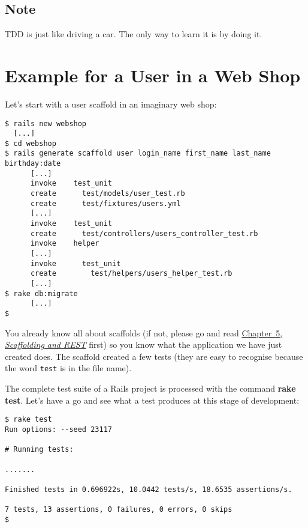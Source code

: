 \documentclass[a4paper]{book}
\begin{document}
\subsection{Note}\label{note-38}

TDD is just like driving a car. The only way to learn it is by doing it.

\section{Example for a User in a Web Shop}\label{example-for-a-user-in-a-web-shop}

Let's start with a user scaffold in an imaginary web shop:

\begin{shaded}\begin{verbatim}
$ rails new webshop
  [...]
$ cd webshop
$ rails generate scaffold user login_name first_name last_name birthday:date
      [...]
      invoke    test_unit
      create      test/models/user_test.rb
      create      test/fixtures/users.yml
      [...]
      invoke    test_unit
      create      test/controllers/users_controller_test.rb
      invoke    helper
      [...]
      invoke      test_unit
      create        test/helpers/users_helper_test.rb
      [...]
$ rake db:migrate
      [...]
$
\end{verbatim}\end{shaded}

You already know all about scaffolds (if not, please go and read \hyperref[scaffolding]{Chapter~5, \emph{Scaffolding and REST}} first) so you know what the application we have just created does. The scaffold created a few tests (they are easy to recognise because the word \texttt{test} is in the file name).

The complete test suite of a Rails project is processed with the command \textbf{rake test}. Let's have a go and see what a test produces at this stage of development:

\begin{shaded}\begin{verbatim}
$ rake test
Run options: --seed 23117

# Running tests:

.......

Finished tests in 0.696922s, 10.0442 tests/s, 18.6535 assertions/s.

7 tests, 13 assertions, 0 failures, 0 errors, 0 skips
$
\end{verbatim}\end{shaded}
\end{document}
